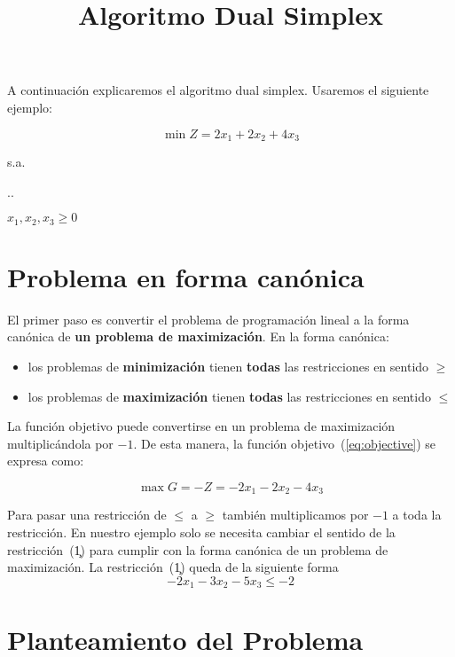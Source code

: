 \documentclass[letter]{article}
\title{Algoritmo Dual Simplex}
\date{}
\begin{document}
\maketitle
A continuación explicaremos el algoritmo dual simplex. Usaremos el siguiente ejemplo:


\begin{equation}\label{eq:objective}
  \min Z = 2x_1 + 2x_2 + 4x_3
\end{equation}


{\centering
s.a.
\vspace{3mm}

  \sysdelim..%

$ x_1, x_2, x_3  \geq 0$ \par}



\section*{Problema en forma canónica}
El primer paso es convertir el problema de programación lineal a la forma canónica de \textbf{un problema de maximización}. En la forma canónica:


\begin{itemize}\parskip3mm
\item los problemas de \textbf{minimización} tienen \textbf{todas} las restricciones en sentido $\geq$ 
\item los problemas de \textbf{maximización} tienen \textbf{todas} las restricciones en sentido $\leq$
\end{itemize}

La función objetivo puede convertirse en un problema de maximización multiplicándola  por $-1$. De esta manera, la función objetivo~(\ref{eq:objective}) se expresa como:


\[  \max G =  -Z = -2x_1 - 2x_2 - 4x_3\]

Para pasar una restricción de $\boldsymbol{\leq}$ a $\boldsymbol{\geq}$ también multiplicamos por $-1$ a toda la restricción. En nuestro ejemplo solo se necesita cambiar el sentido de  la restricción~(\c1) para cumplir con la forma canónica de un problema de maximización. La restricción~(\c1) queda de la siguiente forma \[     -2x_1 - 3x_2 - 5x_3 \leq -2\] 

\section*{Planteamiento del Problema}
\end{document}
